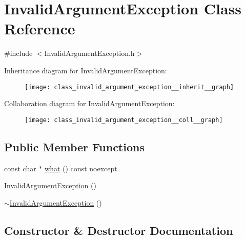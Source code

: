 \hypertarget{class_invalid_argument_exception}{}\section{Invalid\+Argument\+Exception Class Reference}
\label{class_invalid_argument_exception}


{\ttfamily \#include $<$Invalid\+Argument\+Exception.\+h$>$}



Inheritance diagram for Invalid\+Argument\+Exception\+:
\nopagebreak
\begin{figure}[H]
\begin{center}
\leavevmode
\texttt{[image: class\_invalid\_argument\_exception\_\_inherit\_\_graph]}
\end{center}
\end{figure}


Collaboration diagram for Invalid\+Argument\+Exception\+:
\nopagebreak
\begin{figure}[H]
\begin{center}
\leavevmode
\texttt{[image: class\_invalid\_argument\_exception\_\_coll\_\_graph]}
\end{center}
\end{figure}
\subsection*{Public Member Functions}
\begin{DoxyCompactItemize}
\item 
const char $\ast$ \mbox{\hyperlink{class_invalid_argument_exception_a53c2ea0ac458508de1ead18c4c58fc62}{what}} () const noexcept
\item 
\mbox{\hyperlink{class_invalid_argument_exception_a799a9258b47e7ce3316c4044085737b2}{Invalid\+Argument\+Exception}} ()
\item 
\mbox{\hyperlink{class_invalid_argument_exception_aef9114d478766e6c542eb68a26beb1ec}{$\sim$\+Invalid\+Argument\+Exception}} ()
\end{DoxyCompactItemize}


\subsection{Constructor \& Destructor Documentation}
\mbox{\label{class_invalid_argument_exception_a799a9258b47e7ce3316c4044085737b2}} 
